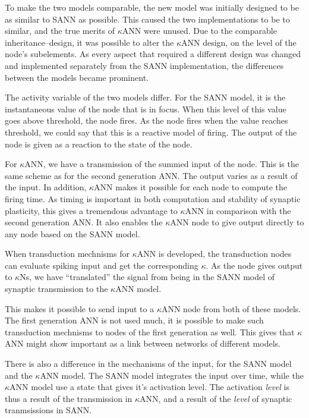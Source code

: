 To make the two models comparable, the new model was initially designed to be as similar to SANN as possible.
This caused the two implementations to be to similar, and the true merits of $\kappa$ANN were unused.
Due to the comparable inheritance--design, it was possible to alter the $\kappa$ANN design, on the level of the node's subelements. %
As every aspect that required a different design was changed and implemented separately from the SANN implementation, the differences between the models became prominent.

The activity variable of the two models differ.
For the SANN model, it is the instantaneous value of the node that is in focus.
When this level of this value goes above threshold, the node fires.
As the node fires when the value reaches threshold, we could say that this is a reactive model of firing.
The output of the node is given as a reaction to the state of the node.

For $\kappa$ANN, we have a transmission of the summed input of the node. 
This is the same scheme as for the second generation ANN. The output varies as a result of the input.
In addition, $\kappa$ANN makes it possible for each node to compute the firing time.
As timing is important in both computation and stability of synaptic plasticity, this gives a tremendous advantage to $\kappa$ANN in comparison with the second generation ANN.
It also enables the $\kappa$ANN node to give output directly to any node based on the SANN model.

When transduction mechnisms for $\kappa$ANN is developed, the transduction nodes can evaluate spiking input and get the corresponding $\kappa$. %
As the node gives output to $\kappa$Ns, we have ``translated'' the signal from being in the SANN model of synaptic transmission to the $\kappa$ANN model.

This makes it possible to send input to a $\kappa$ANN node from both of these models. 
The first generation ANN is not used much, it is possible to make such transduction mechnisms to nodes of the first generation as well.
This gives that $\kappa$ANN might show important as a link between networks of different models.

There is also a difference in the mechanisms of the input, for the SANN model and the $\kappa$ANN model.
The SANN model integrates the input over time, while the $\kappa$ANN model use a state that gives it's activation level.
The activation \emph{level} is thus a result of the transmission in $\kappa$ANN, and a result of the \emph{level} of synaptic tranmsissions in SANN.

